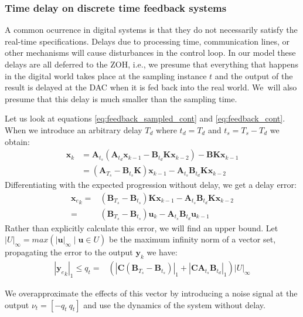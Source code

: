 \documentclass[sigconf]{llncs}
\newcommand{\mat}[1]{\boldsymbol{#1}}
\renewcommand{\vec}[1]{\boldsymbol{#1}}
\begin{document}
\subsubsection{Time delay on discrete time feedback systems} \label{sec:delay}

A common ocurrence in digital systems is that they do not necessarily
satisfy the real-time specifications.  Delays due to processing time,
communication lines, or other mechanisms will cause disturbances in the
control loop.  In our model these delays are all deferred to the ZOH, i.e.,
we presume that everything that happens in the digital world takes place at
the sampling instance $t$ and the output of the result is delayed at the DAC
when it is fed back into the real world.  We~will also presume that this
delay is much smaller than the sampling time.

Let us look at equations \eqref{eq:feedback_sampled_cont} and
\eqref{eq:feedback_cont}.  When we introduce an arbitrary delay $T_d$ where
$t_d=T_d$ and $t_s=T_s-T_d$ we obtain:
%
\begin{align}
\vec{x}_{k} &=\mat{A}_{t_s}(\mat{A}_{t_d}\vec{x}_{k-1}-\mat{B}_{t_d}\mat{K}\vec{x}_{k-2})-\mat{B}\mat{K}\vec{x}_{k-1}\nonumber\\
&=  (\mat{A}_{T_s}-\mat{B}_{t_s}\mat{K})\vec{x}_{k-1}-\mat{A}_{t_s}\mat{B}_{t_d}\mat{K}\vec{x}_{k-2}
\label{eq:delay_cont}
\end{align}
%
Differentiating with the expected progression without delay, we get a delay
error:
%
\begin{align}
{\vec{x}_e}_{k}=&(\mat{B}_{T_s}-\mat{B}_{t_s})\mat{K}\vec{x}_{k-1}-\mat{A}_{t_s}\mat{B}_{t_d}\mat{K}\vec{x}_{k-2}\nonumber\\
=&(\mat{B}_{T_s}-\mat{B}_{t_s})\vec{u}_{k}-\mat{A}_{t_s}\mat{B}_{t_d}\vec{u}_{k-1}
\end{align}
Rather than explicitly calculate this error, we will find an upper bound. Let $|U|_\infty=max(|\vec{u}|_\infty \mid \vec{u} \in U)$ be the maximum infinity norm of a vector set, propagating the error to the output $\vec{y}_k$ we have:
\begin{align}
|{\vec{y}_e}_{k}|_1 \leq q_t=&(|\mat{C}(\mat{B}_{T_s}-\mat{B}_{t_s})|_1+|\mat{C}\mat{A}_{t_s}\mat{B}_{t_d}|_1)|U|_\infty
\end{align}

We overapproximate the effects of this vector by introducing a noise signal at the output $\nu_t=[-q_t\ q_t]$ and use the dynamics of the system without delay.
\end{document}
